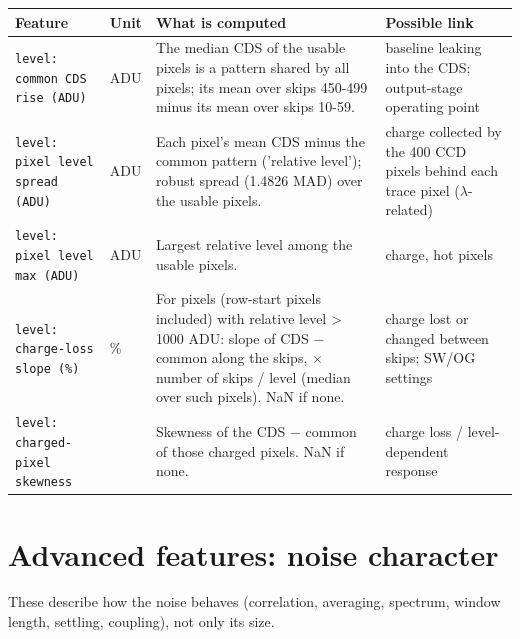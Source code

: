 \documentclass[10pt]{article}
\begin{document}
\begin{longtable}{>{\raggedright\arraybackslash}p{}>{\raggedright\arraybackslash}p{}>{\raggedright\arraybackslash}p{}>{\raggedright\arraybackslash}p{}}
\toprule Feature & Unit & What is computed & Possible link \\ \midrule \endhead
\bottomrule \endfoot
\texttt{level: common CDS rise (ADU)} & ADU & The median CDS of the usable pixels is a pattern shared by all pixels; its mean over skips 450-499 minus its mean over skips 10-59. & baseline leaking into the CDS; output-stage operating point \\
\texttt{level: pixel level spread (ADU)} & ADU & Each pixel's mean CDS minus the common pattern ('relative level'); robust spread (1.4826 MAD) over the usable pixels. & charge collected by the 400 CCD pixels behind each trace pixel ($\lambda$-related) \\
\texttt{level: pixel level max (ADU)} & ADU & Largest relative level among the usable pixels. & charge, hot pixels \\
\texttt{level: charge-loss slope (\%)} & \% & For pixels (row-start pixels included) with relative level \textgreater{} 1000 ADU: slope of CDS $-$ common along the skips, $\times$ number of skips / level (median over such pixels). NaN if none. & charge lost or changed between skips; SW/OG settings \\
\texttt{level: charged-pixel skewness} &  & Skewness of the CDS $-$ common of those charged pixels. NaN if none. & charge loss / level-dependent response \\
\end{longtable}

\section{Advanced features: noise character}
These describe how the noise behaves (correlation, averaging, spectrum, window length, settling, coupling), not only its size.
\end{document}
